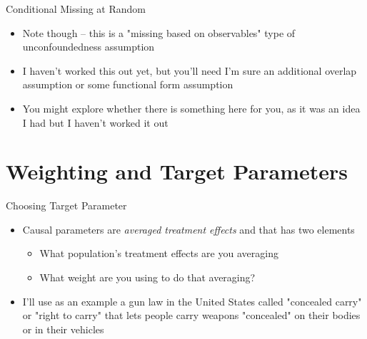 \documentclass{beamer}
\begin{document}
\begin{frame}{Conditional Missing at Random}

\begin{itemize}
    \item Note though -- this is a "missing based on observables" type of unconfoundedness assumption
    \item I haven't worked this out yet, but you'll need I'm sure an additional overlap assumption or some functional form assumption
    \item You might explore whether there is something here for you, as it was an idea I had but I haven't worked it out

\end{itemize}

\end{frame}



\section{Weighting and Target Parameters}



\begin{frame}{Choosing Target Parameter}

\begin{itemize}
\item Causal parameters are \emph{averaged treatment effects} and that has two elements
	\begin{itemize}
	\item What population's treatment effects are you averaging
	\item What weight are you using to do that averaging?
	\end{itemize}
\item I'll use as an example a gun law in the United States called "concealed carry" or "right to carry" that lets people carry weapons "concealed" on their bodies or in their vehicles
\end{itemize}

\end{frame}
\end{document}

